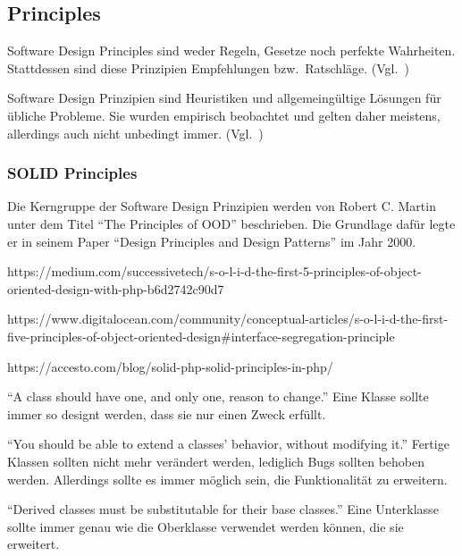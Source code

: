 \subsection{Principles}
Software Design Principles sind weder Regeln, Gesetze noch perfekte Wahrheiten.
Stattdessen sind diese Prinzipien Empfehlungen bzw.\ Ratschläge.
(Vgl.~\cite{getting-a-solid-start})

Software Design Prinzipien sind Heuristiken und allgemeingültige Lösungen für übliche Probleme.
Sie wurden empirisch beobachtet und gelten daher meistens, allerdings auch nicht unbedingt immer.
(Vgl.~\cite{getting-a-solid-start})

\subsubsection{SOLID Principles}
Die Kerngruppe der Software Design Prinzipien werden von Robert C. Martin unter dem Titel \enquote{The Principles of OOD}\cite{solid} beschrieben.
Die Grundlage dafür legte er in seinem Paper \enquote{Design Principles and Design Patterns}\cite{design-principles-and-design-patterns} im Jahr 2000.

https://medium.com/successivetech/s-o-l-i-d-the-first-5-principles-of-object-oriented-design-with-php-b6d2742c90d7

https://www.digitalocean.com/community/conceptual-articles/s-o-l-i-d-the-first-five-principles-of-object-oriented-design#interface-segregation-principle

https://accesto.com/blog/solid-php-solid-principles-in-php/

\enquote{A class should have one, and only one, reason to change.}\cite{solid}
Eine Klasse sollte immer so designt werden, dass sie nur einen Zweck erfüllt\cite{different-types-of-software-design-principles}.

\enquote{You should be able to extend a classes' behavior, without modifying it.}\cite{solid}
Fertige Klassen sollten nicht mehr verändert werden, lediglich Bugs sollten behoben werden\cite{different-types-of-software-design-principles}.
Allerdings sollte es immer möglich sein, die Funktionalität zu erweitern\cite{different-types-of-software-design-principles}.

\enquote{Derived classes must be substitutable for their base classes.}\cite{solid}
Eine Unterklasse sollte immer genau wie die Oberklasse verwendet werden können, die sie erweitert\cite{different-types-of-software-design-principles}.

